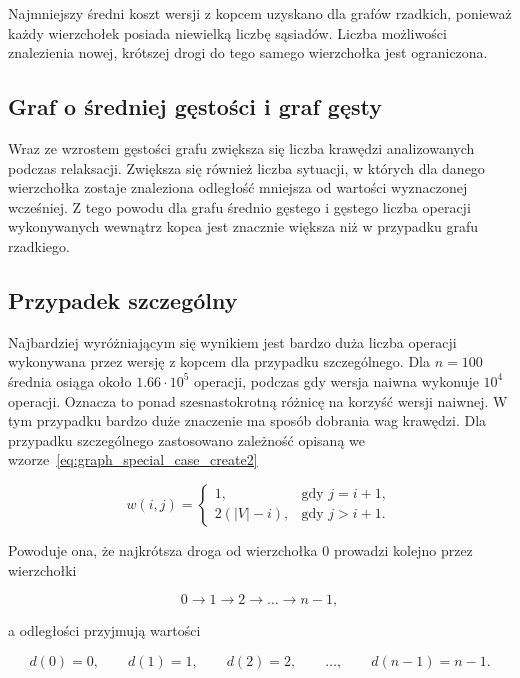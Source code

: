 Najmniejszy średni koszt wersji z kopcem uzyskano dla grafów rzadkich, ponieważ każdy wierzchołek posiada niewielką liczbę sąsiadów. Liczba możliwości znalezienia nowej, krótszej drogi do tego samego wierzchołka jest ograniczona.

\subsection{Graf o średniej gęstości i graf gęsty}

Wraz ze wzrostem gęstości grafu zwiększa się liczba krawędzi analizowanych podczas relaksacji. Zwiększa się również liczba sytuacji, w których dla
danego wierzchołka zostaje znaleziona odległość mniejsza od wartości wyznaczonej wcześniej. Z tego powodu dla grafu średnio gęstego i gęstego liczba operacji
wykonywanych wewnątrz kopca jest znacznie większa niż w przypadku grafu rzadkiego.

\subsection{Przypadek szczególny}
\label{subsec:special_case_heap_results}

Najbardziej wyróżniającym się wynikiem jest bardzo duża liczba operacji wykonywana przez wersję z kopcem dla przypadku szczególnego. Dla \(n=100\) średnia osiąga około \(1.66\cdot10^5\) operacji, podczas gdy wersja naiwna wykonuje \(10^4\) operacji. Oznacza to ponad szesnastokrotną różnicę na korzyść wersji naiwnej. W tym przypadku bardzo duże znaczenie ma sposób dobrania wag krawędzi. Dla przypadku szczególnego zastosowano zależność opisaną we wzorze~\eqref{eq:graph_special_case_create2}

\begin{equation}
\label{eq:graph_special_case_create2} 
w(i,j)=\begin{cases}1, & \text{gdy } j=i+1,\\[6pt]2\left(|V|-i\right), & \text{gdy } j>i+1.
\end{cases}
\end{equation}

\noindent
Powoduje ona, że najkrótsza droga od wierzchołka \(0\) prowadzi kolejno przez wierzchołki

\[
0\rightarrow1\rightarrow2\rightarrow\ldots\rightarrow n-1,
\]

\noindent
a odległości przyjmują wartości

\[
d(0)=0,\qquad d(1)=1,\qquad d(2)=2,\qquad \ldots,\qquad d(n-1)=n-1.
\]

